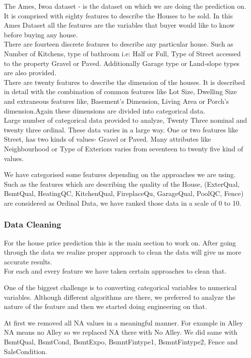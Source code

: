 \documentclass[fleqn,10pt]{SelfArx} %
\begin{document}
The Ames, Iwoa dataset - is the dataset on which we are doing the prediction on. 
It is comprised with eighty features to describe the Houses to be sold. In this Ames Dataset 
all the features are the variables that buyer would like to know before buying any house.
\\ There are fourteen discrete features to describe any particular house. Such as Number of Kitchens, type of bathroom i.e: Half or Full, Type of Street accessed to the property Gravel or Paved. Additionally Garage type or Land-slope types are also provided. 
\\There are twenty features to describe the dimension of the houses. It is  described in detail with the combination of common features like Lot Size, 
Dwelling Size and extraneous features like, Basement's Dimension, Living Area or Porch's dimension.Again these dimensions are divided into categorical data.
\\Large number of categorical data provided to analyze, Twenty Three nominal and twenty three ordinal. These data varies in a large way. One or two features like Street, has two kinds of values- Gravel or Paved. Many attributes like Neighbourhood or Type of Exteriors varies from seventeen to twenty five kind of values.

We have categorised some features depending on the approaches we are using. Such as the features which are describing the quality of the House, (ExterQual, BsmtQual, HeatingQC, KitchenQual, FireplaceQu, GarageQual, PoolQC, Fence) are considered as Ordinal Data, we have ranked those data in a scale of 0 to 10.  


\subsubsection{Data Cleaning}

For the house price prediction this is the main section to work on. After going through the data we realize proper approach to clean the data will give us more accurate results. 
\\For each and every feature we have taken certain approaches to clean that. 

One of the biggest challenge is to converting categorical variables to numerical variables. Although different algorithms are there, we preferred to analyze the nature of the feature and then we started doing engineering on that.

At first we removed all NA values in a meaningful manner.
For example in Alley NA means no Alley so we replaced NA there with No Alley.
We did same with BsmtQual, BsmtCond, BsmtExpo, BsmntFintype1, BsmntFintype2, Fence and SaleCondition.
\end{document}
